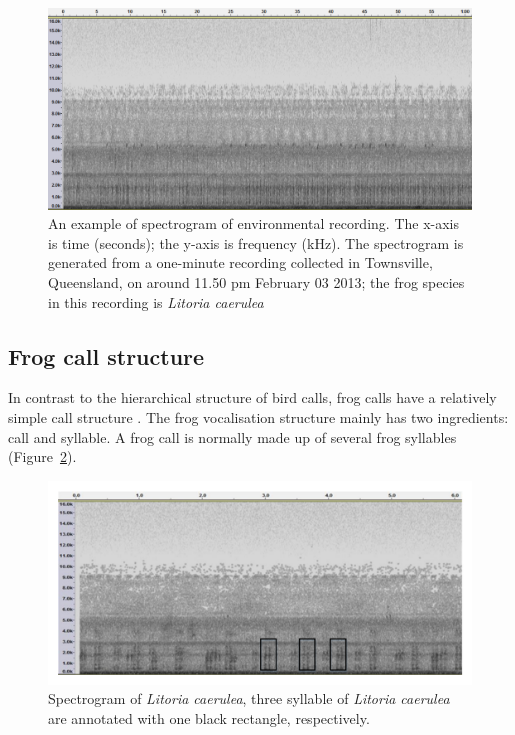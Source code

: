\begin{figure}[htb!]
\centering
\includegraphics[width=\textwidth]{image/Ch1/spectrogram_example.png}
\caption[An example of a spectrogram of environmental recording]{An example of spectrogram of environmental recording. The x-axis is time (seconds); the y-axis is frequency (kHz). The spectrogram is generated from a one-minute recording collected in Townsville, Queensland, on around 11.50 pm February 03 2013; the frog species in this recording is \textit{Litoria caerulea}}
\label{fig:Ch1_spectrogram}
\end{figure}





\subsection{Frog call structure}
In contrast to the hierarchical structure of bird calls, frog calls have a relatively simple call structure \citep{somervuo2006parametric}. The frog vocalisation structure mainly has two ingredients: call and syllable. A frog call is normally made up of several frog syllables (Figure~\ref{fig:Ch1_spec_mark}).

\begin{figure}[htb!]
\centering
\includegraphics[width=\textwidth]{image/Ch1/spectrogram_mark.pdf}
\caption[Spectrogram of \textit{Litoria caerulea}]{Spectrogram of \textit{Litoria caerulea}, three syllable of \textit{Litoria caerulea} are annotated with one black rectangle, respectively.}
\label{fig:Ch1_spec_mark}
\end{figure}


